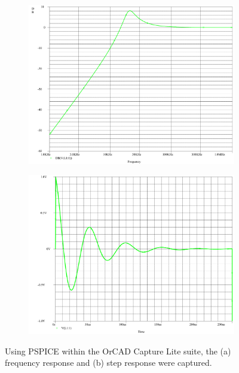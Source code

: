 \documentclass{report}
\begin{document}
\begin{figure}[H]
	\centering
	\begin{subfigure}{0.45\textwidth}
		\centering
		\includegraphics[width=\linewidth]{exp1_orcad_bode}
		\caption{}
	\end{subfigure}
	\begin{subfigure}{0.45\textwidth}
		\centering
		\includegraphics[width=\linewidth]{exp1_orcad_step}
		\caption{}
	\end{subfigure}
	\caption{Using PSPICE within the OrCAD Capture Lite suite, the (a) frequency response and (b) step response were captured.}
	\label{fig:exp1_orcad}	
\end{figure}
\end{document}

